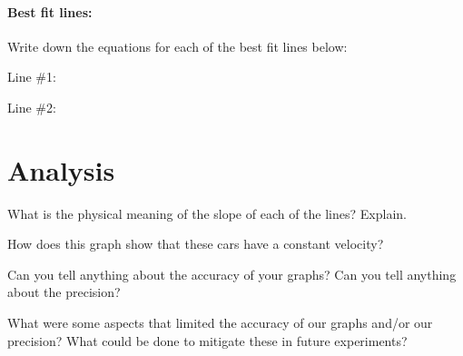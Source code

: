 \documentclass[10pt]{exam}
\begin{document}
  \paragraph{Best fit lines:}
    Write down the equations for each of the best fit lines below:

    \vspace{1em}

    Line \#1:

    \vspace{2em}

    Line \#2:
  
    \vspace{2em}

\section*{Analysis}

\begin{questions}

  \question
    What is the physical meaning of the slope of each of the lines?  Explain.
    \vs
    
  \question
    How does this graph show that these cars have a constant velocity?
    \vs
  
  \question
    Can you tell anything about the accuracy of your graphs?  Can you tell anything about the precision?
    \vs
  
  \question
    What were some aspects that limited the accuracy of our graphs and/or our precision?  What could be done to mitigate these in future experiments?
    \vs
  
  


\end{questions}
\end{document}
